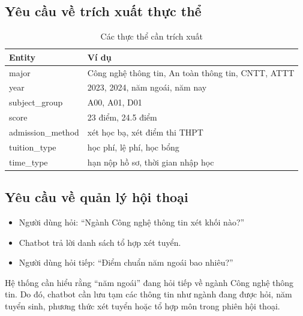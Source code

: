 \subsection{Yêu cầu về trích xuất thực thể}
\begin{table}[H]
\centering
\caption{Các thực thể cần trích xuất}
\label{tab:entities_main}
\begin{tabular}{|p{3.2cm}|p{8.8cm}|}
\hline
\textbf{Entity} & \textbf{Ví dụ} \\ \hline
major & Công nghệ thông tin, An toàn thông tin, CNTT, ATTT \\ \hline
year & 2023, 2024, năm ngoái, năm nay \\ \hline
subject\_group & A00, A01, D01 \\ \hline
score & 23 điểm, 24.5 điểm \\ \hline
admission\_method & xét học bạ, xét điểm thi THPT \\ \hline
tuition\_type & học phí, lệ phí, học bổng \\ \hline
time\_type & hạn nộp hồ sơ, thời gian nhập học \\ \hline
\end{tabular}
\end{table}

\subsection{Yêu cầu về quản lý hội thoại}
\begin{itemize}
    \item Người dùng hỏi: ``Ngành Công nghệ thông tin xét khối nào?''
    \item Chatbot trả lời danh sách tổ hợp xét tuyển.
    \item Người dùng hỏi tiếp: ``Điểm chuẩn năm ngoái bao nhiêu?''
\end{itemize}

Hệ thống cần hiểu rằng ``năm ngoái'' đang hỏi tiếp về ngành Công nghệ thông tin. Do đó, chatbot cần lưu tạm các thông tin như ngành đang được hỏi, năm tuyển sinh, phương thức xét tuyển hoặc tổ hợp môn trong phiên hội thoại.

